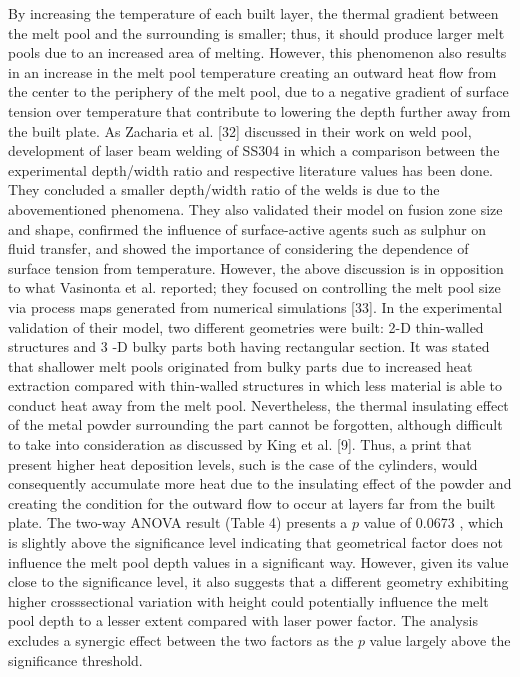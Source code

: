 \documentclass[10pt]{article}
\begin{document}
By increasing the temperature of each built layer, the thermal gradient between the melt pool and the surrounding is smaller; thus, it should produce larger melt pools due to an increased area of melting. However, this phenomenon also results in an increase in the melt pool temperature creating an outward heat flow from the center to the periphery of the melt pool, due to a negative gradient of surface tension over temperature that contribute to lowering the depth further away from the built plate. As Zacharia et al. [32] discussed in their work on weld pool, development of laser beam welding of SS304 in which a comparison between the experimental depth/width ratio and respective literature values has been done. They concluded a smaller depth/width ratio of the welds is due to the abovementioned phenomena. They also validated their model on fusion zone size and shape, confirmed the influence of surface-active agents such as sulphur on fluid transfer, and showed the importance of considering the dependence of surface tension from temperature. However, the above discussion is in opposition to what Vasinonta et al. reported; they focused on controlling the melt pool size via process maps generated from numerical simulations [33]. In the experimental validation of their model, two different geometries were built: 2-D thin-walled structures and 3 -D bulky parts both having rectangular section. It was stated that shallower melt pools originated from bulky parts due to increased heat extraction compared with thin-walled structures in which less material is able to conduct heat away from the melt pool. Nevertheless, the thermal insulating effect of the metal powder surrounding the part cannot be forgotten, although difficult to take into consideration as discussed by King et al. [9]. Thus, a print that present higher heat deposition levels, such is the case of the cylinders, would consequently accumulate more heat due to the insulating effect of the powder and creating the condition for the outward flow to occur at layers far from the built plate. The two-way ANOVA result (Table 4) presents a $p$ value of 0.0673 , which is slightly above the significance level indicating that geometrical factor does not influence the melt pool depth values in a significant way. However, given its value close to the significance level, it also suggests that a different geometry exhibiting higher crosssectional variation with height could potentially influence the melt pool depth to a lesser extent compared with laser power factor. The analysis excludes a synergic effect between the two factors as the $p$ value largely above the significance threshold.
\end{document}

